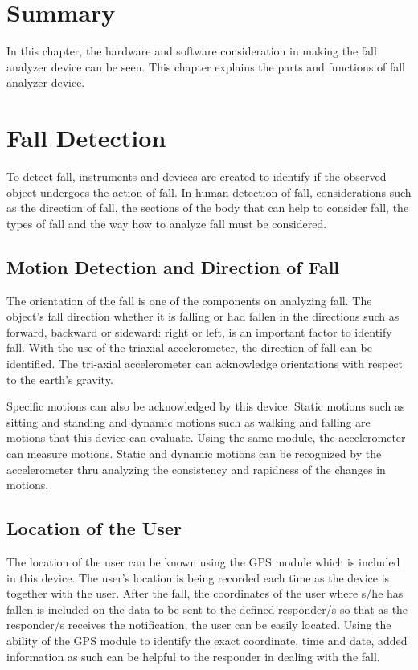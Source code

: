 \section{Summary}

In this chapter, the hardware and software consideration in making the fall analyzer device can be seen. This chapter explains the parts and functions of fall analyzer device.

\section{Fall Detection}

To detect fall, instruments and devices are created to identify if the observed object undergoes the action of fall. In human detection of fall, considerations such as the direction of fall, the sections of the body that can help to consider fall, the types of fall and the way how to analyze fall must be considered.

\subsection{Motion Detection and Direction of Fall}

The orientation of the fall is one of the components on analyzing fall. The object’s fall direction whether it is falling or had fallen in the directions such as forward, backward or sideward: right or left, is an important factor to identify fall. With the use of the triaxial-accelerometer, the direction of fall can be identified. The tri-axial accelerometer can acknowledge orientations with respect to the earth’s gravity.

Specific motions can also be acknowledged by this device. Static motions such as sitting and standing and dynamic motions such as walking and falling are motions that this device can evaluate. Using the same module, the accelerometer can measure motions. Static and dynamic motions can be recognized by the accelerometer thru analyzing the consistency and rapidness of the changes in motions. 

\subsection{Location of the User}

The location of the user can be known using the GPS module which is included in this device. The user’s location is being recorded each time as the device is together with the user. After the fall, the coordinates of the user where s/he has fallen is included on the data to be sent to the defined responder/s so that as the responder/s receives the notification, the user can be easily located. Using the ability of the GPS module to identify the exact coordinate, time and date, added information as such can be helpful to the responder in dealing with the fall.

